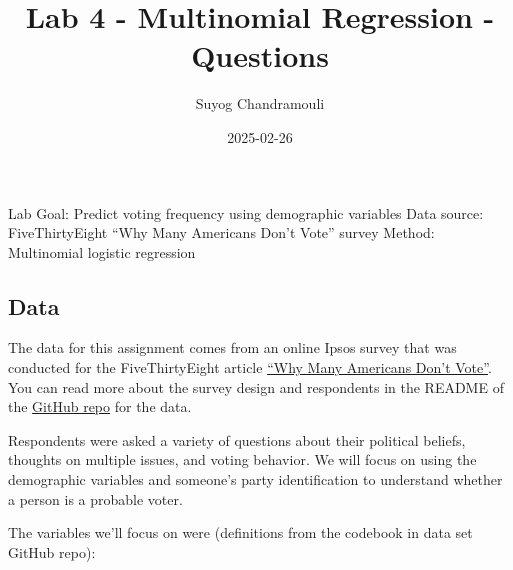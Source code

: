 \documentclass[
  letterpaper,
  DIV=11,
  numbers=noendperiod]{scrartcl}
\title{Lab 4 - Multinomial Regression - Questions}
\author{Suyog Chandramouli}
\date{2025-02-26}
\begin{document}
\maketitle

Lab Goal: Predict voting frequency using demographic variables Data
source: FiveThirtyEight ``Why Many Americans Don't Vote'' survey Method:
Multinomial logistic regression

\subsection{Data}\label{data}

The data for this assignment comes from an online Ipsos survey that was
conducted for the FiveThirtyEight article
\href{https://projects.fivethirtyeight.com/non-voters-poll-2020-election/}{``Why
Many Americans Don't Vote''}. You can read more about the survey design
and respondents in the README of the
\href{https://github.com/fivethirtyeight/data/tree/master/non-voters}{GitHub
repo} for the data.

Respondents were asked a variety of questions about their political
beliefs, thoughts on multiple issues, and voting behavior. We will focus
on using the demographic variables and someone's party identification to
understand whether a person is a probable voter.

The variables we'll focus on were (definitions from the codebook in data
set GitHub repo):
\end{document}
